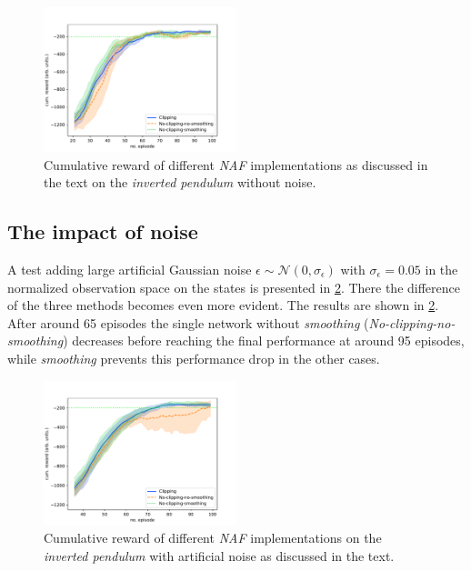 \documentclass[
reprint,
amsmath,amssymb,amsfonts,clevref,
aps,
prstab,
]{revtex4-2}
\begin{document}
	\begin{figure}[!h]
		\centering
		\includegraphics*[width=0.5\textwidth]{Figures/Comparison_naf}
		\caption{Cumulative reward of different \emph{NAF} implementations as discussed in the text on the \emph{inverted pendulum} without noise.}
		\label{fig:comparsion_smoothing_small}
	\end{figure}
	
	
	
	
	
	\subsection{The impact of noise}\label{appendix:The impact of noise}
	A test adding large artificial Gaussian noise $\epsilon \sim \mathcal{N}(0, \sigma_\epsilon)$ with $\sigma_\epsilon=0.05$ in the normalized observation space on the states is presented in \cref{fig:comparsion_noise}. There the difference of the three methods becomes even more evident. The results are shown in \cref{fig:comparsion_noise}. After around 65 episodes the single network without \emph{smoothing} (\emph{No-clipping-no-smoothing}) decreases before reaching the final performance at around 95 episodes, while  \emph{smoothing} prevents this performance drop in the other cases. 
	\begin{figure}
		\centering
		\includegraphics*[width=0.5\textwidth]{Figures/Comparison_noise}
		\caption{Cumulative reward of different \emph{NAF} implementations on the \emph{inverted pendulum} with artificial noise as discussed in the text.}
		\label{fig:comparsion_noise}
	\end{figure}
\end{document}
